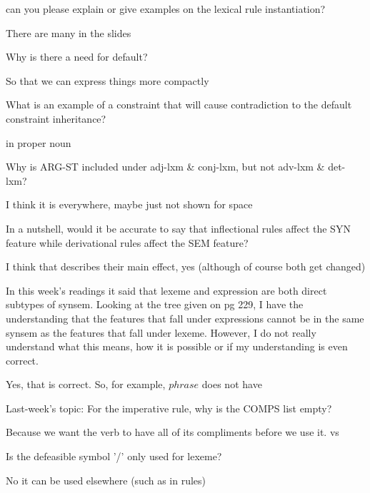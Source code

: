 \documentclass[a4paper,landscape,headrule,footrule,dvips]{foils}
\begin{document}
\avmfont{\it}

\maketitle




\Q can you please explain or give examples on the lexical rule instantiation?

\A There are many in the slides

\Q Why is there a need for default?

\A So that we can express things more compactly

\Q What is an example of a constraint that will cause contradiction to the default constraint inheritance?

\A {}  in proper noun 

\Q Why is ARG-ST included under adj-lxm \& conj-lxm, but not adv-lxm \& det-lxm?

\A I think it is everywhere, maybe just not shown for space

\newpage

\Q In a nutshell, would it be accurate to say that inflectional rules affect the SYN feature while derivational rules affect the SEM feature?

\A I think that describes their main effect, yes (although of course
both get changed)

\Q In this week's readings it said that lexeme and expression are both direct subtypes of synsem. Looking at the tree given on pg 229, I have the understanding that the features that fall under expressions cannot be in the same synsem as the features that fall under lexeme. However, I do not really understand what this means, how it is possible or if my understanding is even correct.

\A Yes, that is correct.  So, for example, $phrase$ does not have 

\newpage

\Q Last-week's topic:
For the imperative rule, why is the COMPS list empty?

\A Because we want the verb to have all of its compliments before we
use it.   vs 

\Q Is the defeasible symbol '/' only used for lexeme?

\A No it can be used elsewhere (such as in rules)
\end{document}
